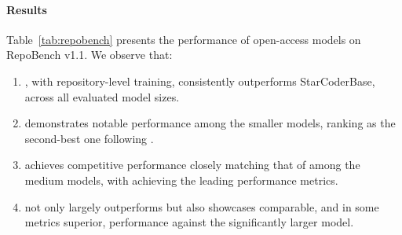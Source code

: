 \documentclass[10pt]{article} %
\begin{document}
\paragraph{Results} Table~\ref{tab:repobench} presents the performance of open-access models on RepoBench v1.1. We observe that:
\begin{enumerate}
    \item \starcodertwo{}, with repository-level training, consistently outperforms StarCoderBase, across all evaluated model sizes.
    \item {} demonstrates notable performance among the smaller models, ranking as the second-best one following .
    \item {} achieves competitive performance closely matching that of  among the medium models, with  achieving the leading performance metrics.
    \item {} not only largely outperforms  but also showcases comparable, and in some metrics superior, performance against the significantly larger  model.
\end{enumerate}
\end{document}
